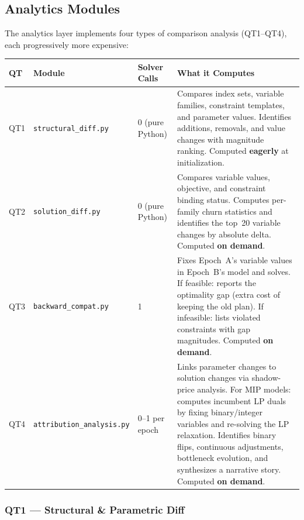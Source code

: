 \documentclass[11pt, a4paper]{article}
\begin{document}
\subsection{Analytics Modules}

The analytics layer implements four types of comparison analysis (QT1--QT4),
each progressively more expensive:

\begin{longtable}{p{1cm} p{3.5cm} p{2.5cm} p{7cm}}
\toprule
\textbf{QT} & \textbf{Module} & \textbf{Solver Calls} & \textbf{What it Computes} \\
\midrule
QT1 & \texttt{structural\_diff.py} & 0 (pure Python) &
    Compares index sets, variable families, constraint templates,
    and parameter values.  Identifies additions, removals, and
    value changes with magnitude ranking.
    Computed \textbf{eagerly} at initialization. \\
\midrule
QT2 & \texttt{solution\_diff.py} & 0 (pure Python) &
    Compares variable values, objective, and constraint binding
    status.  Computes per-family churn statistics and identifies
    the top~20 variable changes by absolute delta.
    Computed \textbf{on demand}. \\
\midrule
QT3 & \texttt{backward\_compat.py} & 1 &
    Fixes Epoch~A's variable values in Epoch~B's model and solves.
    If feasible: reports the optimality gap (extra cost of keeping
    the old plan).  If infeasible: lists violated constraints with
    gap magnitudes.
    Computed \textbf{on demand}. \\
\midrule
QT4 & \texttt{attribution\_analysis.py} & 0--1 per epoch &
    Links parameter changes to solution changes via shadow-price
    analysis.  For MIP models: computes incumbent LP duals by
    fixing binary/integer variables and re-solving the LP relaxation.
    Identifies binary flips, continuous adjustments, bottleneck
    evolution, and synthesizes a narrative story.
    Computed \textbf{on demand}. \\
\bottomrule
\end{longtable}

\subsubsection{QT1 --- Structural \& Parametric Diff}
\end{document}
